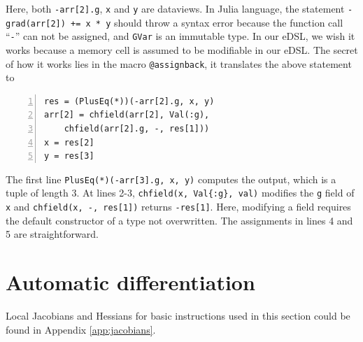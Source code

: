 \documentclass[aps,twocolumn,longbibliography,english,superscriptaddress]{revtex4-1}
\newcommand{\<}{\langle}
\renewcommand{\>}{\rangle}
\newcommand{\App}[1]{Appendix \ref{#1}}
\theoremstyle{definition}\newtheorem{definition}{\textit{Definition}}
\begin{document}
Here, both \texttt{-arr[2].g}, \texttt{x} and \texttt{y} are dataviews. In Julia language, the statement \texttt{-grad(arr[2]) += x * y} should throw a syntax error because the function call ``\texttt{-}'' can not be assigned, and \texttt{GVar} is an immutable type.
In our eDSL, we wish it works because a memory cell is assumed to be modifiable in our eDSL.
The secret of how it works lies in the macro \texttt{@assignback}, it translates the above statement to

\begin{minipage}{.44\textwidth}
    \begin{lstlisting}[numberstyle=\scriptsize\color{gray},numbers=left,numbersep=8pt]
res = (PlusEq(*))(-arr[2].g, x, y)
arr[2] = chfield(arr[2], Val(:g),
    chfield(arr[2].g, -, res[1]))
x = res[2]
y = res[3]
\end{lstlisting}
\end{minipage}

The first line \texttt{PlusEq(*)(-arr[3].g, x, y)} computes the output, which is a tuple of length $3$.
At lines 2-3, \texttt{chfield(x, Val\{:g\}, val)} modifies the \texttt{g} field of \texttt{x} and \texttt{chfield(x, -, res[1])} returns \texttt{-res[1]}. Here, modifying a field requires the default constructor of a type not overwritten.
The assignments in lines 4 and 5 are straightforward.

\section{Automatic differentiation}\label{sec:bp}

Local Jacobians and Hessians for basic instructions used in this section could be found in \App{app:jacobians}.
\end{document}
